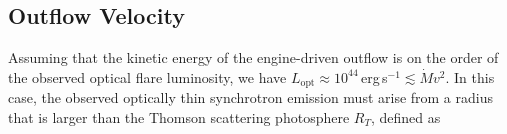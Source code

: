 \documentclass{nature_plusfigure}
\begin{document}
\begin{methods}





\section{Outflow Velocity}
\label{sec:outflow-velocity}

Assuming that the kinetic energy of the engine-driven outflow is on the order of the observed optical flare luminosity, we have $L_\mathrm{opt} \approx 10^{44}\,$erg\,s$^{-1} \lesssim \dot{M}v^2$. In this case, the observed optically thin synchrotron emission must arise from a radius that is larger than the Thomson scattering photosphere $R_T$, defined as


\end{methods}
\end{document}
